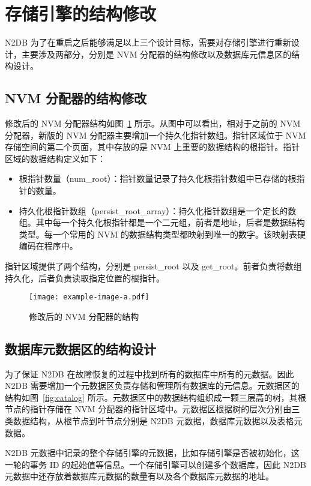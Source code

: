 \section{存储引擎的结构修改}

N2DB 为了在重启之后能够满足以上三个设计目标，需要对存储引擎进行重新设计，主要涉及两部分，分别是 NVM 分配器的结构修改以及数据库元信息区的结构设计。

\subsection{NVM 分配器的结构修改}
修改后的 NVM 分配器结构如图~\ref{fig:nvm-allocator} 所示。从图中可以看出，相对于之前的 NVM 分配器，新版的 NVM 分配器主要增加一个持久化指针数组。指针区域位于 NVM 存储空间的第二个页面，其中存放的是 NVM 上重要的数据结构的根指针。指针区域的数据结构定义如下：
\begin{itemize}
    \item 根指针数量（num\_root）：指针数量记录了持久化根指针数组中已存储的根指针的数量。
    \item 持久化根指针数组（persist\_root\_array）：持久化指针数组是一个定长的数组。其中每一个持久化根指针都是一个二元组，前者是地址，后者是数据结构类型。每一个常用的 NVM 的数据结构类型都映射到唯一的数字。该映射表硬编码在程序中。
\end{itemize}
指针区域提供了两个结构，分别是 persist\_root 以及 get\_root。前者负责将数组持久化，后者负责读取指定位置的根指针。

\begin{figure}[ht]
    \centering
    \texttt{[image: example-image-a.pdf]}
    \caption{修改后的 NVM 分配器的结构}
    \label{fig:nvm-allocator}
\end{figure}

\subsection{数据库元数据区的结构设计}

为了保证 N2DB 在故障恢复的过程中找到所有的数据库中所有的元数据。因此 N2DB 需要增加一个元数据区负责存储和管理所有数据库的元信息。元数据区的结构如图~\ref{fig:catalog} 所示。元数据区中的数据结构组织成一颗三层高的树，其根节点的指针存储在 NVM 分配器的指针区域中。元数据区根据树的层次分别由三类数据结构，从根节点到叶节点分别是 N2DB 元数据，数据库元数据以及表格元数据。

N2DB 元数据中记录的整个存储引擎的元数据，比如存储引擎是否被初始化，这一轮的事务 ID 的起始值等信息。一个存储引擎可以创建多个数据库，因此 N2DB 元数据中还存放着数据库元数据的数量有以及各个数据库元数据的地址。

